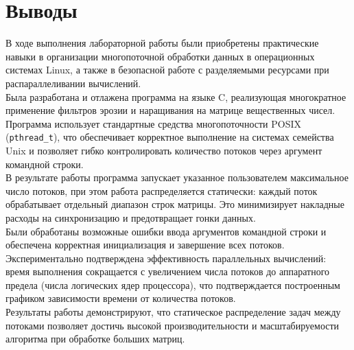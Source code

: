 \section{Выводы}
В ходе выполнения лабораторной работы были приобретены практические навыки в организации многопоточной обработки данных в операционных системах Linux, а также в безопасной работе с разделяемыми ресурсами при распараллеливании вычислений.\\
Была разработана и отлажена программа на языке C, реализующая многократное применение фильтров эрозии и наращивания на матрице вещественных чисел. Программа использует стандартные средства многопоточности POSIX (\texttt{pthread\_t}), что обеспечивает корректное выполнение на системах семейства Unix и позволяет гибко контролировать количество потоков через аргумент командной строки.\\
В результате работы программа запускает указанное пользователем максимальное число потоков, при этом работа распределяется статически: каждый поток обрабатывает отдельный диапазон строк матрицы. Это минимизирует накладные расходы на синхронизацию и предотвращает гонки данных.\\
Были обработаны возможные ошибки ввода аргументов командной строки и обеспечена корректная инициализация и завершение всех потоков. Экспериментально подтверждена эффективность параллельных вычислений: время выполнения сокращается с увеличением числа потоков до аппаратного предела (числа логических ядер процессора), что подтверждается построенным графиком зависимости времени от количества потоков.\\
Результаты работы демонстрируют, что статическое распределение задач между потоками позволяет достичь высокой производительности и масштабируемости алгоритма при обработке больших матриц.
\pagebreak
